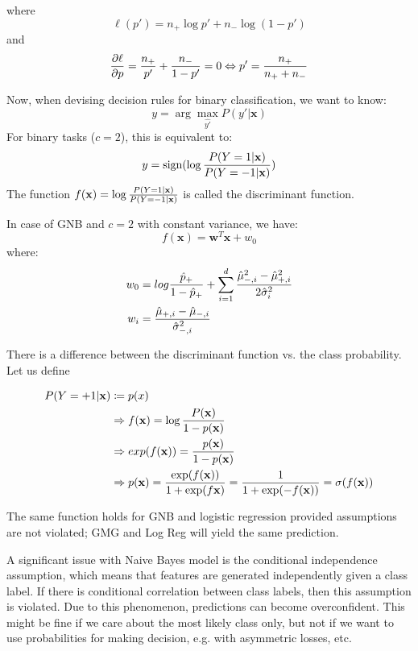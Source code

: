 \documentclass[a4paper,10pt,twoside]{article}
\begin{document}
where
\begin{equation*}
  \ell(p')=n_+\log p'+n_-\log (1-p')
\end{equation*}
and
\begin{equation*}
  {\partial\ell\over\partial p} ={n_+\over p'}+{n_-\over 1-p'}=0\Leftrightarrow p'={n_+\over n_++n_-}
\end{equation*}

Now, when devising decision rules for binary classification, we want to know:
\begin{equation*}
  y=\arg\max_{\hat
    {y'}} P(y'| \mathbf{x})
\end{equation*}
For binary tasks ($c=2$), this is equivalent to:
\begin{equation*}
    y=\text{sign}(\log{P(Y=1|\mathbf{x})\over P(Y=-1|\mathbf{x})})
\end{equation*}
The function $f(\mathbf{x})=\log{P(Y=1|\mathbf{x})\over P(Y=-1|\mathbf{x})}$ is called the discriminant function.

In case of GNB and $c=2$ with constant variance, we have:
\begin{equation*}
  f(\mathbf{x})=\mathbf{w}^T\mathbf{x}+w_0
\end{equation*}
where:
\begin{align*}
  w_0&=log{\hat{p}_+\over1-\hat{p}_+}+\sum_{i=1}^{d}{\hat{\mu}^2_{-,i}-\hat{\mu}^2_{+,i}\over 2\hat{\sigma}^2_{i}}\\
  w_i&={\hat{\mu}_{+,i}-\hat{\mu}_{-,i} \over\hat{\sigma}^2_{-,i}}
\end{align*}

There is a difference between the discriminant function vs. the class probability. Let us define

\begin{align*}
  P(Y=+1|\mathbf{x})&\coloneqq p(x)\\
                    &\Rightarrow f(\mathbf{x})=\log{P(\mathbf{x})\over 1-p(\mathbf{x})}\\
                    &\Rightarrow exp(f(\mathbf{x}))={p(\mathbf{x})\over 1-p(\mathbf{x})}\\
                    &\Rightarrow p(\mathbf{x})={\exp(f(\mathbf{x}))\over 1+\exp(f\mathbf{x})}={1\over1+\exp(-f(\mathbf{x}))}=\sigma(f(\mathbf{x}))
\end{align*}

The same function holds for GNB and logistic regression provided assumptions are not violated; GMG and Log Reg will yield the same prediction.

A significant issue with Naive Bayes model is the conditional independence assumption, which means that features are generated independently given a class label. If there is conditional correlation between class labels, then this assumption is violated. Due to this phenomenon, predictions can become overconfident. This might be fine if we care about the most likely class only, but not if we want to use probabilities for making decision, e.g. with asymmetric losses, etc.
\end{document}

